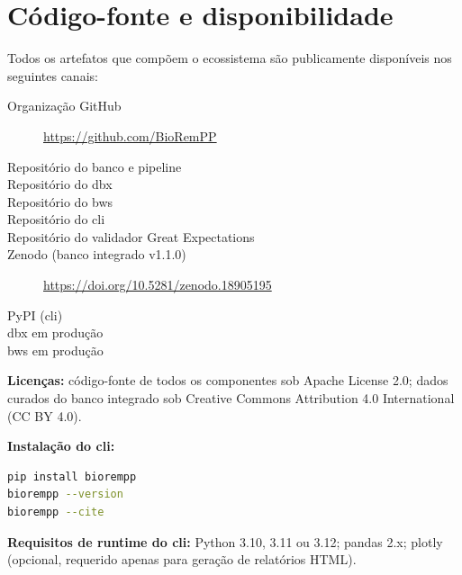 \chapter{Código-fonte e disponibilidade}
\label{ape:codigo-fonte}

Todos os artefatos que compõem o ecossistema \biorempp{} são publicamente disponíveis nos seguintes canais:

\begin{description}
    \item[Organização GitHub] \url{https://github.com/BioRemPP}
    \item[Repositório do banco e pipeline] 
    \item[Repositório do \gls{dbx}] 
    \item[Repositório do \gls{bws}] 
    \item[Repositório do \gls{cli}] 
    \item[Repositório do validador Great Expectations] 
    \item[Zenodo (banco integrado v1.1.0)] \url{https://doi.org/10.5281/zenodo.18905195}
    \item[PyPI (\gls{cli})] 
    \item[\gls{dbx} em produção] 
    \item[\gls{bws} em produção] 
\end{description}

\textbf{Licenças:} código-fonte de todos os componentes sob Apache License 2.0; dados curados do banco integrado sob Creative Commons Attribution 4.0 International (CC BY 4.0).

\textbf{Instalação do \gls{cli}:}
\begin{lstlisting}[language=bash]
pip install biorempp
biorempp --version
biorempp --cite
\end{lstlisting}

\textbf{Requisitos de runtime do \gls{cli}:} Python 3.10, 3.11 ou 3.12; pandas 2.x; plotly (opcional, requerido apenas para geração de relatórios HTML).

